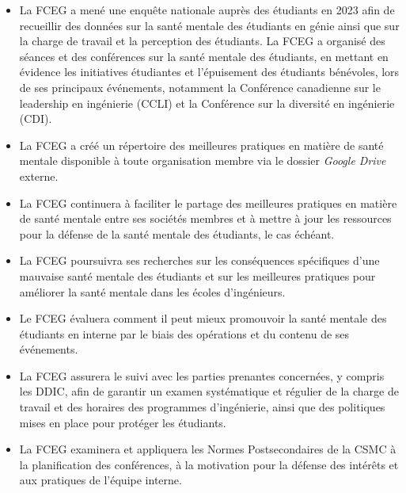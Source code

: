 \begin{itemize}
 \item La FCEG a mené une enquête nationale auprès des étudiants en 2023 afin de recueillir des données sur la santé mentale des étudiants en génie ainsi que sur la charge de travail et la perception des étudiants. La FCEG a organisé des séances et des conférences sur la santé mentale des étudiants, en mettant en évidence les initiatives étudiantes et l'épuisement des étudiants bénévoles, lors de ses principaux événements, notamment la Conférence canadienne sur le leadership en ingénierie (CCLI) et la Conférence sur la diversité en ingénierie (CDI).
 \item La FCEG a créé un répertoire des meilleures pratiques en matière de santé mentale disponible à toute organisation membre via le dossier \textit{Google Drive} externe.
\end{itemize}

\begin{itemize}
 \item La FCEG continuera à faciliter le partage des meilleures pratiques en matière de santé mentale entre ses sociétés membres et à mettre à jour les ressources pour la défense de la santé mentale des étudiants, le cas échéant.
 \item La FCEG poursuivra ses recherches sur les conséquences spécifiques d'une mauvaise santé mentale des étudiants et sur les meilleures pratiques pour améliorer la santé mentale dans les écoles d'ingénieurs.
 \item Le FCEG évaluera comment il peut mieux promouvoir la santé mentale des étudiants en interne par le biais des opérations et du contenu de ses événements.
 \item La FCEG assurera le suivi avec les parties prenantes concernées, y compris les DDIC, afin de garantir un examen systématique et régulier de la charge de travail et des horaires des programmes d'ingénierie, ainsi que des politiques mises en place pour protéger les étudiants.
 \item La FCEG examinera et appliquera les Normes Postsecondaires de la CSMC à la planification des conférences, à la motivation pour la défense des intérêts et aux pratiques de l'équipe interne.
\end{itemize}

\newpage
